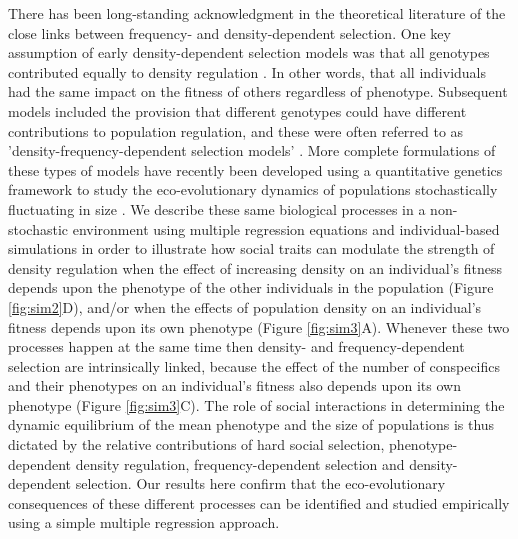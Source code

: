 \documentclass{article}
\begin{document}
There has been long-standing acknowledgment in the theoretical literature of the close links between frequency- and density-dependent selection. One key assumption of early density-dependent selection models was that all genotypes contributed equally to density regulation \citep{Joshi2001}. In other words, that all individuals had the same impact on the fitness of others regardless of phenotype. Subsequent models included the provision that different genotypes could have different contributions to population regulation, and these were often referred to as 'density-frequency-dependent selection models' \citep{Anderson1971, Matessi1976, Asmussen1983}. More complete formulations of these types of models have recently been developed using a quantitative genetics framework to study the eco-evolutionary dynamics of populations stochastically fluctuating in size \citep{Lande2007, Engen2020}. We describe these same biological processes in a non-stochastic environment using multiple regression equations and individual-based simulations in order to illustrate how social traits can modulate the strength of density regulation when the effect of increasing density on an individual's fitness depends upon the phenotype of the other individuals in the population (Figure \ref{fig:sim2}D), and/or when the effects of population density on an individual's fitness depends upon its own phenotype (Figure \ref{fig:sim3}A). Whenever these two processes happen at the same time then density- and frequency-dependent selection are intrinsically linked, because the effect of the number of conspecifics and their phenotypes on an individual's fitness also depends upon its own phenotype (Figure \ref{fig:sim3}C). The role of social interactions in determining the dynamic equilibrium of the mean phenotype and the size of populations is thus dictated by the relative contributions of hard social selection, phenotype-dependent density regulation, frequency-dependent selection and density-dependent selection. Our results here confirm that the eco-evolutionary consequences of these different processes can be identified and studied empirically using a simple multiple regression approach. 
\end{document}
